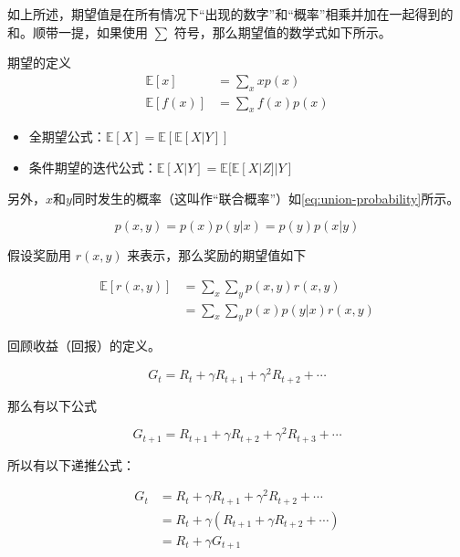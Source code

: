 \documentclass[lang=cn,newtx,10pt,scheme=chinese]{elegantbook}
\begin{document}
如上所述，期望值是在所有情况下``出现的数字''和``概率''相乘并加在一起得到的和。顺带一提，如果使用 $\sum$ 符号，那么期望值的数学式如下所示。

\begin{definition}{期望的定义}{}
\begin{equation}
\begin{aligned}
\mathbb{E}[x] &= \sum_xxp(x) \\
\mathbb{E}[f(x)] &= \sum_xf(x)p(x)
\end{aligned}
\end{equation}
\end{definition}

\begin{marker}
\begin{itemize}
\item 全期望公式：$\mathbb{E}[X]=\mathbb{E}[\mathbb{E}[X|Y]]$
\item 条件期望的迭代公式：$\mathbb{E}[X|Y]=\mathbb{E}[\mathbb{E}[X|Z]|Y]$
\end{itemize}
\end{marker}

另外，$x$和$y$同时发生的概率（这叫作``联合概率''）如\ref{eq:union-probability}所示。

\begin{equation}\label{eq:union-probability}
p(x,y)=p(x)p(y|x)=p(y)p(x|y)
\end{equation}

假设奖励用 $r(x,y)$ 来表示，那么奖励的期望值如下

\begin{equation}
\begin{aligned}
\mathbb{E}[r(x,y)] &= \sum_x\sum_yp(x,y)r(x,y) \\
&= \sum_x\sum_yp(x)p(y|x)r(x,y)
\end{aligned}
\end{equation}

回顾收益（回报）的定义。

\begin{equation}
G_t = R_t + \gamma R_{t+1} + \gamma^2 R_{t+2} + \cdots
\end{equation}

那么有以下公式

\begin{equation}
G_{t+1} = R_{t+1} + \gamma R_{t+2} + \gamma^2 R_{t+3} + \cdots
\end{equation}

所以有以下递推公式：

\begin{equation}
\begin{aligned}
G_t &= R_t+\gamma R_{t+1}+\gamma^2R_{t+2}+\cdots \\
&= R_t + \gamma(R_{t+1}+\gamma R_{t+2}+\cdots) \\
&= R_t+\gamma G_{t+1}
\end{aligned}
\end{equation}
\end{document}
